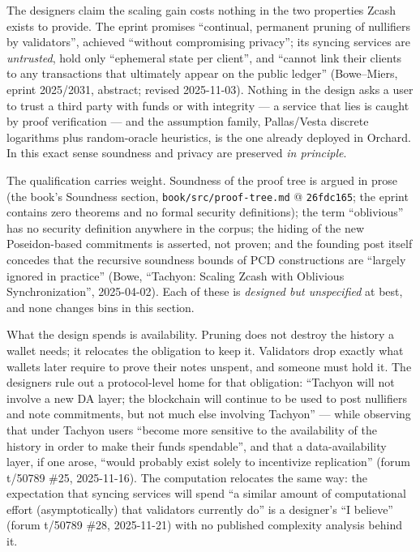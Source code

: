 \documentclass[11pt,a4paper]{article}
\theoremstyle{definition}
\begin{document}
The designers claim the scaling gain costs nothing in the two properties
Zcash exists to provide. The eprint promises ``continual, permanent pruning
of nullifiers by validators'', achieved ``without compromising privacy'';
its syncing services are \emph{untrusted}, hold only ``ephemeral state per
client'', and ``cannot link their clients to any transactions that
ultimately appear on the public ledger'' (Bowe--Miers, eprint 2025/2031,
abstract; revised 2025-11-03). Nothing in the design asks a user to trust a
third party with funds or with integrity --- a service that lies is caught
by proof verification --- and the assumption family, Pallas/Vesta discrete
logarithms plus random-oracle heuristics, is the one already deployed in
Orchard. In this exact sense soundness and privacy are preserved \emph{in
principle}.

The qualification carries weight. Soundness of the proof tree is argued in
prose (the book's Soundness section, \texttt{book/src/proof-tree.md} @
\texttt{26fdc165}; the eprint contains zero theorems and no formal security
definitions); the term ``oblivious'' has no security definition anywhere in
the corpus; the hiding of the new Poseidon-based commitments is asserted,
not proven; and the founding post itself concedes that the recursive
soundness bounds of PCD constructions are ``largely ignored in practice''
(Bowe, ``Tachyon: Scaling Zcash with Oblivious Synchronization'',
2025-04-02). Each of these is \emph{designed but unspecified} at best, and
none changes bins in this section.

What the design spends is availability. Pruning does not destroy the
history a wallet needs; it relocates the obligation to keep it. Validators
drop exactly what wallets later require to prove their notes unspent, and
someone must hold it. The designers rule out a protocol-level home for that
obligation: ``Tachyon will not involve a new DA layer; the blockchain will
continue to be used to post nullifiers and note commitments, but not much
else involving Tachyon'' --- while observing that under Tachyon users
``become more sensitive to the availability of the history in order to make
their funds spendable'', and that a data-availability layer, if one arose,
``would probably exist solely to incentivize replication'' (forum t/50789
\#25, 2025-11-16). The computation relocates the same way: the expectation
that syncing services will spend ``a similar amount of computational effort
(asymptotically) that validators currently do'' is a designer's ``I
believe'' (forum t/50789 \#28, 2025-11-21) with no published complexity
analysis behind it.
\end{document}
